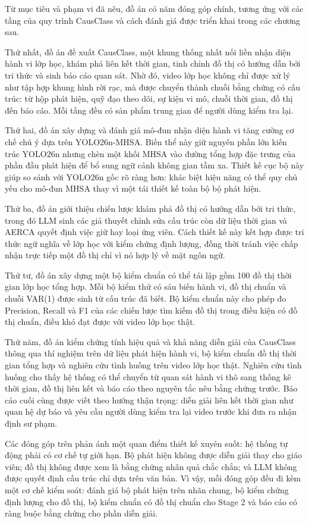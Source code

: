 Từ mục tiêu và phạm vi đã nêu, đồ án có năm đóng góp chính, tương ứng với các tầng của quy trình CausClass và cách đánh giá được triển khai trong các chương sau.

Thứ nhất, đồ án đề xuất CausClass, một khung thống nhất nối liền nhận diện hành vi lớp học, khám phá liên kết thời gian, tinh chỉnh đồ thị có hướng dẫn bởi tri thức và sinh báo cáo quan sát. Nhờ đó, video lớp học không chỉ được xử lý như tập hợp khung hình rời rạc, mà được chuyển thành chuỗi bằng chứng có cấu trúc: từ hộp phát hiện, quỹ đạo theo dõi, sự kiện vi mô, chuỗi thời gian, đồ thị đến báo cáo. Mỗi tầng đều có sản phẩm trung gian để người dùng kiểm tra lại.

Thứ hai, đồ án xây dựng và đánh giá mô-đun nhận diện hành vi tăng cường cơ chế chú ý dựa trên YOLO26n-MHSA. Biến thể này giữ nguyên phần lớn kiến trúc YOLO26n nhưng chèn một khối MHSA vào đường tổng hợp đặc trưng của phần đầu phát hiện để bổ sung ngữ cảnh không gian tầm xa. Thiết kế cục bộ này giúp so sánh với YOLO26n gốc rõ ràng hơn: khác biệt hiệu năng có thể quy chủ yếu cho mô-đun MHSA thay vì một tái thiết kế toàn bộ bộ phát hiện.

Thứ ba, đồ án giới thiệu chiến lược khám phá đồ thị có hướng dẫn bởi tri thức, trong đó LLM sinh các giả thuyết chỉnh sửa cấu trúc còn dữ liệu thời gian và AERCA quyết định việc giữ hay loại ứng viên. Cách thiết kế này kết hợp được tri thức ngữ nghĩa về lớp học với kiểm chứng định lượng, đồng thời tránh việc chấp nhận trực tiếp một đồ thị chỉ vì nó hợp lý về mặt ngôn ngữ.

Thứ tư, đồ án xây dựng một bộ kiểm chuẩn có thể tái lập gồm 100 đồ thị thời gian lớp học tổng hợp. Mỗi bộ kiểm thử có sáu biến hành vi, đồ thị chuẩn và chuỗi VAR(1) được sinh từ cấu trúc đã biết. Bộ kiểm chuẩn này cho phép đo Precision, Recall và F1 của các chiến lược tìm kiếm đồ thị trong điều kiện có đồ thị chuẩn, điều khó đạt được với video lớp học thật.

Thứ năm, đồ án kiểm chứng tính hiệu quả và khả năng diễn giải của CausClass thông qua thí nghiệm trên dữ liệu phát hiện hành vi, bộ kiểm chuẩn đồ thị thời gian tổng hợp và nghiên cứu tình huống trên video lớp học thật. Nghiên cứu tình huống cho thấy hệ thống có thể chuyển từ quan sát hành vi thô sang thống kê thời gian, đồ thị liên kết và báo cáo theo nguyên tắc nêu bằng chứng trước. Báo cáo cuối cùng được viết theo hướng thận trọng: diễn giải liên kết thời gian như quan hệ dự báo và yêu cầu người dùng kiểm tra lại video trước khi đưa ra nhận định sư phạm.

Các đóng góp trên phản ánh một quan điểm thiết kế xuyên suốt: hệ thống tự động phải có cơ chế tự giới hạn. Bộ phát hiện không được diễn giải thay cho giáo viên; đồ thị không được xem là bằng chứng nhân quả chắc chắn; và LLM không được quyết định cấu trúc chỉ dựa trên văn bản. Vì vậy, mỗi đóng góp đều đi kèm một cơ chế kiểm soát: đánh giá bộ phát hiện trên nhãn chung, bộ kiểm chứng định lượng cho đồ thị, bộ kiểm chuẩn có đồ thị chuẩn cho Stage 2 và báo cáo có ràng buộc bằng chứng cho phần diễn giải.